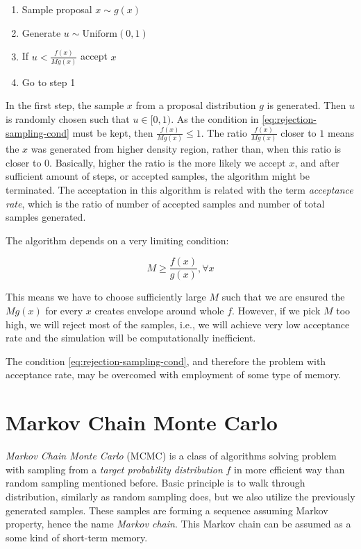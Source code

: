 \documentclass[
  digital, %
  oneside, %
  lof,     %
  lot,     %
]{fithesis4}
\begin{document}
\begin{enumerate}
  \item Sample proposal $x \sim g(x)$
  \item Generate $u \sim \text{Uniform}(0, 1)$
  \item If $u < \frac{f(x)}{M g(x)}$ accept $x$
  \item Go to step 1
\end{enumerate}

In the first step, the sample $x$ from a proposal
distribution $g$ is generated.
Then $u$ is randomly chosen such that $u \in [0, 1)$.
As the condition in \eqref{eq:rejection-sampling-cond}
must be kept, then $\frac{f(x)}{M g(x)} \leq 1$.
The ratio $\frac{f(x)}{M g(x)}$ closer to $1$
means the $x$ was generated from higher density
region, rather than, when this ratio is closer 
to $0$.
Basically, higher the ratio is the more likely
we accept $x$, and after sufficient amount of 
steps, or accepted samples, the algorithm might 
be terminated.
The acceptation in this algorithm is related 
with the term \textit{acceptance rate}, which is
the ratio of number of accepted samples and 
number of total samples generated.

The algorithm depends on a very limiting condition:

\begin{equation}\label{eq:rejection-sampling-cond}
  M \geq \frac{f(x)}{g(x)}, \forall x
\end{equation}

This means we have to choose sufficiently large $M$
such that we are ensured the $M g(x)$ for every $x$
creates envelope around whole $f$.
However, if we pick $M$ too high,
we will reject most of the samples, i.e., we will 
achieve very low acceptance rate and
the simulation will be computationally inefficient.

The condition \eqref{eq:rejection-sampling-cond},
and therefore the problem with acceptance rate,
may be overcomed with employment of some type
of memory.


\section{Markov Chain Monte Carlo}

\textit{Markov Chain Monte Carlo} (MCMC) is a class of 
algorithms solving problem with sampling from a 
\textit{target probability distribution} $f$ in more 
efficient way than random sampling mentioned before. 
Basic principle is to walk through 
distribution, similarly as random sampling 
does, but we also utilize the previously
generated samples.
These samples are forming a sequence
assuming Markov property, hence the
name \textit{Markov chain}.
This Markov chain can be assumed as a some kind of
short-term memory.
\end{document}
